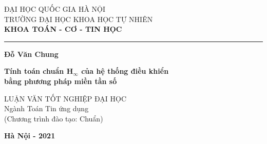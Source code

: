\documentclass[12pt,a4paper]{article}
\begin{document}
\begin{titlepage}


\begin{center}
	{\fontsize{14pt}{15.6}\selectfont
	ĐẠI HỌC QUỐC GIA HÀ NỘI \\
	TRƯỜNG ĐẠI HỌC KHOA HỌC TỰ NHIÊN\\}
	\medspace
	{\fontsize{13pt}{15.6}\selectfont
	\textbf{KHOA TOÁN - CƠ - TIN HỌC}}
	
	\rule{7.25cm}{1pt}
	
	\vfill
	{\fontsize{14}{15.6}\selectfont \textbf{Đỗ Văn Chung}}
	\vfill
	
	{\fontsize{18}{20}\selectfont \textbf{Tính toán chuẩn H$_\infty$ của hệ thống điều khiển \\ bằng phương pháp miền tần số}}
	\vfill
	
	{\fontsize{14}{15.6}\selectfont 
	LUẬN VĂN TỐT NGHIỆP ĐẠI HỌC\\
	\vspace{1cm}
	Ngành Toán Tin ứng dụng\\
	(Chương trình đào tạo: Chuẩn)
	}

	\vfill
	{\fontsize{14}{15.6}\selectfont \textbf{Hà Nội - 2021}}
\end{center}
\end{titlepage}
\end{document}
